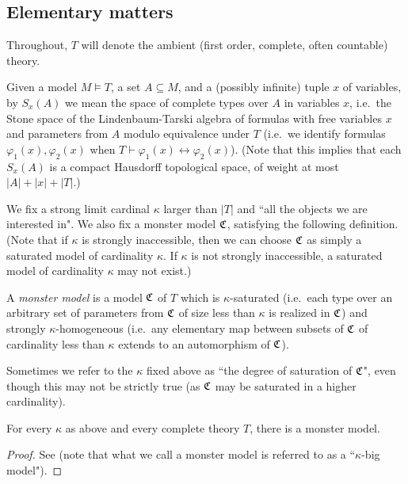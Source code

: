 	\subsection*{Elementary matters}
	
	Throughout, $T$ will denote the ambient (first order, complete, often countable) theory.
	
	\begin{dfn}
		Given a model $M\models T$, a set $A\subseteq M$, and a (possibly infinite) tuple $x$ of variables, by $S_x(A)$ we mean the space of complete types over $A$ in variables $x$, i.e.\ the Stone space of the Lindenbaum-Tarski algebra of formulas with free variables $x$ and parameters from $A$ modulo equivalence under $T$ (i.e.\ we identify formulas $\varphi_1(x),\varphi_2(x)$ when $T\vdash \varphi_1(x)\leftrightarrow \varphi_2(x)$). (Note that this implies that each $S_x(A)$ is a compact Hausdorff topological space, of weight at most $\lvert A\rvert+\lvert x\rvert+\lvert T\rvert$.)\xqed{\lozenge}
	\end{dfn}
	
	We fix a strong limit cardinal $\kappa$ larger than $\lvert T\rvert$ and ``all the objects we are interested in". We also fix a monster model $\fC$, satisfying the following definition. (Note that if $\kappa$ is strongly inaccessible, then we can choose $\fC$ as simply a saturated model of cardinality $\kappa$. If $\kappa$ is not strongly inaccessible, a saturated model of cardinality $\kappa$ may not exist.)
	
	\begin{dfn}
		\index{model!monster}
		\index{C@$\fC$|see {monster model}}
		A \emph{monster model} is a model $\fC$ of $T$ which is $\kappa$-saturated (i.e.\ each type over an arbitrary set of parameters from $\fC$ of size less than $\kappa$ is realized in $\fC$) and strongly $\kappa$-homogeneous (i.e.\ any elementary map between subsets of $\fC$ of cardinality less than $\kappa$ extends to an automorphism of $\fC$).
		\xqed{\lozenge}
	\end{dfn}
	
	Sometimes we refer to the $\kappa$ fixed above as ``the degree of saturation of $\fC$", even though this may not be strictly true (as $\fC$ may be saturated in a higher cardinality).
	
	\begin{fct}
		For every $\kappa$ as above and every complete theory $T$, there is a monster model.
	\end{fct}
	\begin{proof}
		See \cite[Theorem 10.2.1]{Hod93} (note that what we call a monster model is referred to as a ``$\kappa$-big model").
	\end{proof}
	

